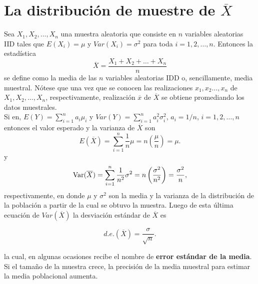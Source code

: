 \section{\boldmath La distribución de muestre de $\overline{X}$}

Sea $X_1,X_2,\ldots , X_n$ una muestra aleatoria que consiste en $n$ variables aleatorias IID tales que $E(X_i)=\mu$ y $Var(X_i)=\sigma^2$ para toda $i=1,2,\ldots,n$. Entonces la estadística
$$\overline{X}=\dfrac{X_1+X_2+\ldots + X_n}{n}$$
se define como la media de las $n$ variables aleatorias IDD o, sencillamente, media muestral. Nótese que una vez que se conocen las realizaciones $x_1,x_2\ldots,x_n$ de $X_1,X_2,\ldots,X_n$, respectivamente, realización $\overline{x}$ de $\overline{X}$ se obtiene promediando los datos muestrales. \\
Si en, $E(Y)=\sum_{i=1}^{n}a_i\mu_i$ y $Var(Y)=\sum_{i=1}^n a_i^2 \sigma_i^2$, $a_i=1/n$, $i=1,2,\ldots,n$ entonces el valor esperado y la varianza de $\overline{X}$ son
$$E(\overline{X})=\sum_{i=1}^n \dfrac{1}{n}\mu=n\left(\dfrac{\mu}{n}\right)=\mu.$$
y
$$\mathop{\mbox{\normalfont Var}}\nolimits(\overline{X}) = \sum_{i=1}^n \dfrac{1}{n^2} \sigma^2 = n \left(\dfrac{\sigma^2}{n^2}\right)=\dfrac{\sigma^2}{n},$$
respectivamente, en donde $\mu$ y $\sigma^2$ son la media y la varianza de la distribución de la población a partir de la cual se obtuvo la muestra. Luego de esta última ecuación de $Var(\overline{X})$ la desviación estándar de $\overline{X}$ es
\begin{tcolorbox}
    $$d.e.(\overline{X})=\dfrac{\sigma}{\sqrt{n}}.$$
\end{tcolorbox}
la cual, en algunas ocasiones recibe el nombre de \textbf{error estándar de la media}. Si el tamaño de la muestra crece, la precisión de la media muestral para estimar la media poblacional aumenta. 


